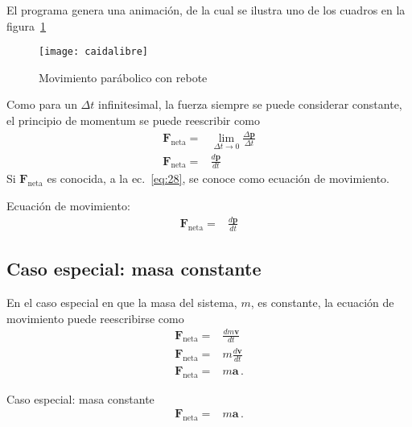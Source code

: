 \begin{frame}
  El programa genera una animación, de la cual  se ilustra uno de los cuadros en la figura~\ref{fig:caidalibre}
  \begin{figure}
    \centering
    \texttt{[image: caidalibre]}
    \caption{Movimiento parábolico con rebote}
    \label{fig:caidalibre}
  \end{figure}

\end{frame}



Como para un $\Delta t$ infinitesimal, la fuerza siempre se puede considerar constante, el principio de momentum se puede reescribir como
\begin{align}
  \label{eq:28}
  \mathbf{F}_{\text{neta}}=&\lim_{\Delta t\to 0}\frac{\Delta\mathbf{p}}{\Delta t}\nonumber\\
 \mathbf{F}_{\text{neta}}=&\frac{d\mathbf{p} }{dt}
\end{align}
Si $\mathbf{F}_{\text{neta}}$ es conocida, a la ec.~\eqref{eq:28}, se conoce como ecuación de movimiento.

\begin{frame}
  \begin{block}%
{Ecuación de movimiento:}
  \begin{align*}
   \mathbf{F}_{\text{neta}}=&\frac{d\mathbf{p} }{dt}
   \end{align*}
  \end{block}
\end{frame}

\subsection{Caso especial: masa constante}
En el caso especial en que la masa del sistema, $m$, es constante, la ecuación de movimiento puede reescribirse como
\begin{align}
   \mathbf{F}_{\text{neta}}=&\frac{d m\mathbf{v} }{dt}\nonumber\\
   \mathbf{F}_{\text{neta}}=&m\frac{d \mathbf{v} }{dt}\nonumber\\
   \mathbf{F}_{\text{neta}}=&m\mathbf{a}\,.
\end{align}

\begin{frame}
  \begin{block}%
{Caso especial: masa constante}
\begin{align}
   \mathbf{F}_{\text{neta}}=&m\mathbf{a}\,.
\end{align}
\end{block}
\end{frame}

